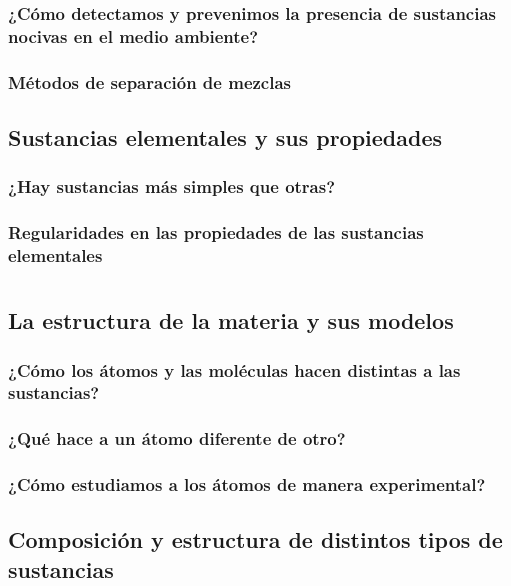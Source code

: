 \documentclass[11pt]{book}
\begin{document}
\subsection{¿Cómo detectamos y prevenimos la presencia de sustancias nocivas en el medio ambiente?}

\subsection{Métodos de separación de mezclas}

\newpage
\section{Sustancias elementales y sus propiedades}
\subsection{¿Hay sustancias más simples que otras?}
\subsection{Regularidades en las propiedades de las sustancias elementales}

\chapter{}

\newpage
\section{La estructura de la materia y sus modelos}
\subsection{¿Cómo los átomos y las moléculas hacen distintas a las sustancias?}
\subsection{¿Qué hace a un átomo diferente de otro?}
\subsection{¿Cómo estudiamos a los átomos de manera experimental?}

\newpage
\section{Composición y estructura de distintos tipos de sustancias}
\end{document}
